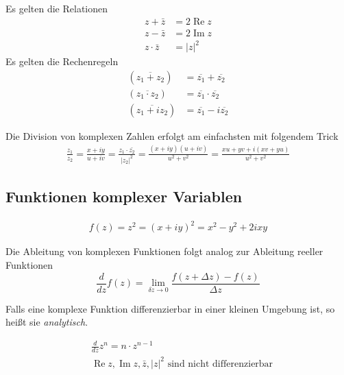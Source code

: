 Es gelten die Relationen
\begin{align}
z+\bar{z} &= 2\operatorname{Re}z\\
z-\bar{z} &= 2\operatorname{Im}z \nonumber\\
z\cdot\bar{z} &= |z|^2 \nonumber
\end{align}
Es gelten die Rechenregeln
\begin{align}
(\overline{z_1 + z_2}) &= \overline{z_1}+\overline{z_2} \\
(\overline{z_1 \cdot z_2}) &= \overline{z_1} \cdot \overline{z_2} \nonumber\\
(\overline{z_1 + iz_2}) &= \overline{z_1}-i\overline{z_2} \nonumber
\end{align}
\begin{Bemerkung}
Die Division von komplexen Zahlen erfolgt am einfachsten mit folgendem Trick
\begin{align*}
\frac{z_1}{z_2} = \frac{x + iy}{u + iv} = \frac{z_1 \cdot \bar{z_2}}{|z_2|^2} =
\frac {(x + iy)(u + iv)}{u^2 + v^2} = \frac{xu + yv + i(xv+yu)}{u^2+v^2}
\end{align*}
\end{Bemerkung}

\subsection{Funktionen komplexer Variablen}

\begin{Beispiel}
\begin{align*}
f(z) = z^2 = (x + iy)^2  = x^2 - y^2 + 2ixy
\end{align*}
\end{Beispiel}
Die Ableitung von komplexen Funktionen folgt analog zur Ableitung reeller
Funktionen
\begin{equation}
\frac{d}{dz}f(z)=\lim \limits_{\delta z \to 0} \frac{f(z+\Delta z) -
f(z)}{\Delta z}
\end{equation}
\begin{Bemerkung}
Falls eine komplexe Funktion differenzierbar in einer kleinen Umgebung ist, so
heißt sie {\em analytisch}.
\end{Bemerkung}
\begin{Beispiel}
\begin{align*}
&\frac{d}{dz} z^n = n \cdot z^{n-1}\\
&\operatorname{Re}z,\operatorname{Im}z,\bar{z}, |z|^2 \text{ sind nicht
differenzierbar}
\end{align*}
\end{Beispiel}

